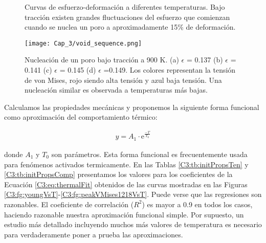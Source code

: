 \begin{figure}[htp]
\centering
{}
\caption[Curvas de esfuerzo-deformación a diferentes temperaturas.]{Curvas de esfuerzo-deformación a diferentes temperaturas. Bajo tracción existen grandes fluctuaciones del esfuerzo que comienzan cuando se nuclea un poro a aproximadamente 15\% de deformación.}
\label{figure:sStrain}
\end{figure}

\begin{figure}[htp]
\centering
\texttt{[image: Cap\_3/void\_sequence.png]}
\caption[Nucleación de un poro bajo tracción a 900 K.]{Nucleación de un poro bajo tracción a 900 K. (a) $\epsilon$ = 0.137 (b) $\epsilon$ = 0.141 (c) $\epsilon$ = 0.145 (d) $\epsilon$ =0.149. Los colores representan la tensión de von Mises, rojo siendo alta tensión y azul baja tensión. Una nucleación similar es observada a temperaturas más bajas.}
\label{C3:fg:voidSeq}
\end{figure}

Calculamos las propiedades mecánicas y proponemos la siguiente forma funcional como aproximación del comportamiento térmico:


\begin{eqnarray}
y = A_{1}\cdot \mathrm{e}^{\frac{-T}{T_{0}}}
\label{C3:eq:thermalFit}
\end{eqnarray}

donde $A_{1}$ y $T_{0}$ son parámetros. Esta forma funcional es frecuentemente usada para fenómenos activados termicamente. En las Tablas \ref{C3:tb:initPropsTen} y \ref{C3:tb:initPropsComp} presentamos los valores para los coeficientes de la Ecuación \ref{C3:eq:thermalFit} obtenidos de las curvas mostradas en las Figuras \ref{C3:fg:youngVsT}-\ref{C3:fg:peakVMises1218VsT}. Puede verse que las regresiones son razonables. El coeficiente de correlación ($R^2$) es mayor a 0.9 en todos los casos, haciendo razonable nuestra aproximación funcional simple. Por supuesto, un estudio más detallado incluyendo muchos más valores de temperatura es necesario para verdaderamente poner a prueba las aproximaciones.
	

